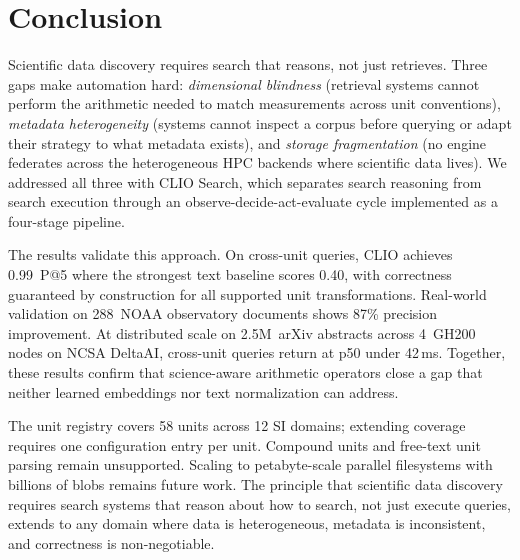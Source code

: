\section{Conclusion}

Scientific data discovery requires search that reasons, not just retrieves. Three gaps make automation hard: \emph{dimensional blindness} (retrieval systems cannot perform the arithmetic needed to match measurements across unit conventions), \emph{metadata heterogeneity} (systems cannot inspect a corpus before querying or adapt their strategy to what metadata exists), and \emph{storage fragmentation} (no engine federates across the heterogeneous HPC backends where scientific data lives). We addressed all three with CLIO Search, which separates search reasoning from search execution through an observe-decide-act-evaluate cycle implemented as a four-stage pipeline.

The results validate this approach. On cross-unit queries, CLIO achieves 0.99~P@5 where the strongest text baseline scores 0.40, with correctness guaranteed by construction for all supported unit transformations. Real-world validation on 288~NOAA observatory documents shows 87\% precision improvement. At distributed scale on 2.5M~arXiv abstracts across 4~GH200 nodes on NCSA DeltaAI, cross-unit queries return at p50 under 42\,ms. Together, these results confirm that science-aware arithmetic operators close a gap that neither learned embeddings nor text normalization can address.

The unit registry covers 58 units across 12 SI domains; extending coverage requires one configuration entry per unit. Compound units and free-text unit parsing remain unsupported. Scaling to petabyte-scale parallel filesystems with billions of blobs remains future work. The principle that scientific data discovery requires search systems that reason about how to search, not just execute queries, extends to any domain where data is heterogeneous, metadata is inconsistent, and correctness is non-negotiable.
